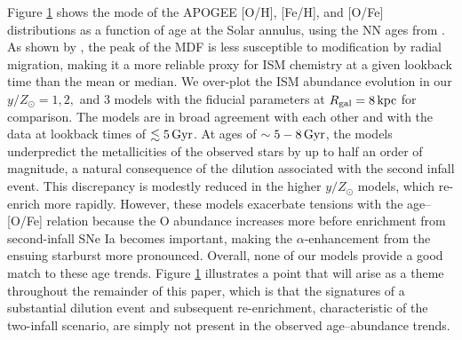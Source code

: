 \documentclass[twocolumn,twocolappendix,linenumbers]{aastex631}
\newcommand{\yZ}[1]{$y/Z_\odot=#1$}
\newcommand{\kpc}{\,{\rm kpc}}
\newcommand{\Gyr}{\,{\rm Gyr}}
\newcommand{\dex}{\,{\rm dex}}
\begin{document}
\begin{figure}
{    %
    }
    \label{fig:yield-outflow}
\end{figure}

Figure \ref{fig:yield-outflow} shows the mode of the APOGEE [O/H], [Fe/H], and [O/Fe] distributions as a function of age at the Solar annulus, using the NN ages from \citet{leung_variational_2023}. As shown by \citet{johnson_milky_2024}, the peak of the MDF is less susceptible to modification by radial migration, making it a more reliable proxy for ISM chemistry at a given lookback time than the mean or median.
We over-plot the ISM abundance evolution in our $y/Z_\odot=1,2,$ and $3$ models with the fiducial parameters at $R_{\rm gal}=8\kpc$ for comparison. The models are in broad agreement with each other and with the data at lookback times of $\lesssim5\Gyr$. At ages of $\sim5-8\Gyr$, the models underpredict the metallicities of the observed stars by up to half an order of magnitude, a natural consequence of the dilution associated with the second infall event. This discrepancy is modestly reduced in the higher $y/Z_\odot$ models, which re-enrich more rapidly. However, these models exacerbate tensions with the age--[O/Fe] relation because the O abundance increases more before enrichment from second-infall SNe Ia becomes important, making the $\alpha$-enhancement from the ensuing starburst more pronounced. Overall, none of our models provide a good match to these age trends. Figure \ref{fig:yield-outflow} illustrates a point that will arise as a theme throughout the remainder of this paper, which is that the signatures of a substantial dilution event and subsequent re-enrichment, characteristic of the two-infall scenario, are simply not present in the observed age--abundance trends.
\end{document}
